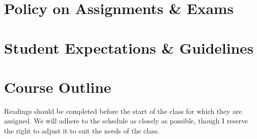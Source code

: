 \documentclass[titlepage]{article}
\newcommand\policy{../policy}
\begin{document}


\section{Policy on Assignments \& Exams}
\label{policy}





\section{Student Expectations \& Guidelines}
\label{expectations}







\section{Course Outline}
\label{outline}

Readings should be completed before the start of the class for which they are
assigned. We will adhere to the schedule as closely as possible, though I
reserve the right to adjust it to suit the needs of the class.
\end{document}
